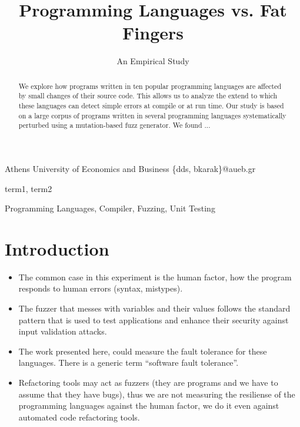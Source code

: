 \documentclass[10pt]{sigplanconf}
\begin{document}
\copyrightdata{[to be supplied]}


\title{Programming Languages vs. Fat Fingers}
\subtitle{An Empirical Study}

      {Athens University of Economics and Business}
      {\{dds, bkarak\}@aueb.gr}

\maketitle

\begin{abstract}
We explore how programs written in ten popular programming languages
are affected by small changes of their source code.
This allows us to analyze the extend to which these languages
can detect simple errors at compile or at run time.
Our study is based on a large corpus of programs written in several programming
languages systematically perturbed using a mutation-based fuzz generator.
We found ... %
\end{abstract}


\terms
term1, term2

\keywords
Programming Languages, Compiler, Fuzzing, Unit Testing

\section{Introduction} %

\cite{C99}

\begin{itemize}
	\item The common case in this experiment is the human factor, how the program responds to human errors (syntax, mistypes).
	\item The fuzzer that messes with variables and their values follows the standard pattern that is used to test applications and enhance their security against input validation attacks.
	\item The work presented here, could measure the fault tolerance for these languages. There is a generic term ``software fault tolerance''.
	\item Refactoring tools may act as fuzzers (they are programs and we have to assume that they have bugs), thus we are not measuring the resiliense of the programming languages against the human factor, we do it even against automated code refactoring tools.
\end{itemize}
\end{document}
